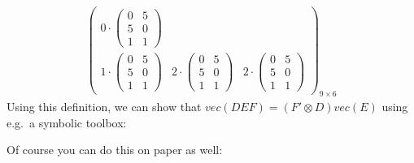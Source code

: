 \begin{enumerate}
\begin{align*}
{\begin{pmatrix}
  0 \cdot \begin{pmatrix} 0 & 5 \\ 5 & 0 \\ 1 & 1 \end{pmatrix}
  \\
  1 \cdot \begin{pmatrix} 0 & 5 \\ 5 & 0 \\ 1 & 1 \end{pmatrix}&
  2 \cdot \begin{pmatrix} 0 & 5 \\ 5 & 0 \\ 1 & 1 \end{pmatrix}&
  2 \cdot \begin{pmatrix} 0 & 5 \\ 5 & 0 \\ 1 & 1 \end{pmatrix}
  \end{pmatrix}
}_{9\times6}
\end{align*}
Using this definition, we can show that \(vec(DEF) = (F' \otimes D) vec(E)\) using e.g.\ a symbolic toolbox:

Of course you can do this on paper as well:


\end{enumerate}
